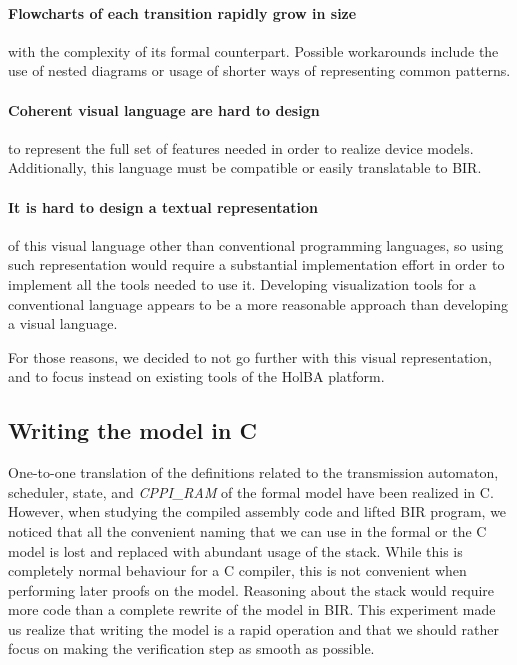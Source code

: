 \documentclass[10pt,a4paper]{article}
\begin{document}
\begin{multicols}{2}
\paragraph{Flowcharts of each transition rapidly grow in size} with the complexity of its formal counterpart. Possible workarounds include the use of nested diagrams or usage of shorter ways of representing common patterns.

\paragraph{Coherent visual language are hard to design} to represent the full set of features needed in order to realize device models. Additionally, this language must be compatible or easily translatable to BIR.

\paragraph{It is hard to design a textual representation} of this visual language other than conventional programming languages, so using such representation would require a substantial implementation effort in order to implement all the tools needed to use it. Developing visualization tools for a conventional language appears to be a more reasonable approach than developing a visual language.

\medskip
For those reasons, we decided to not go further with this visual representation, and to focus instead on existing tools of the HolBA platform.

\subsection{Writing the model in C} \label{c-model}

One-to-one translation of the definitions related to the transmission automaton, scheduler, state, and \textit{CPPI\_RAM} of the formal model have been realized in C. However, when studying the compiled assembly code and lifted BIR program, we noticed that all the convenient naming that we can use in the formal or the C model is lost and replaced with abundant usage of the stack. While this is completely normal behaviour for a C compiler, this is not convenient when performing later proofs on the model. Reasoning about the stack would require more code than a complete rewrite of the model in BIR. This experiment made us realize that writing the model is a rapid operation and that we should rather focus on making the verification step as smooth as possible.


\end{multicols}
\end{document}
